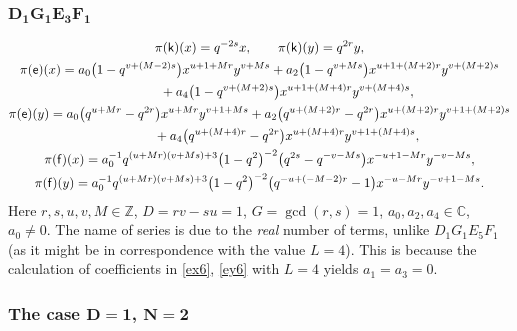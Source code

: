 \documentclass[10pt,a4paper]{amsart}
\numberwithin{equation}{section}
\begin{document}
\subsubsection*{$\boldsymbol{D_1G_1E_3F_1}$}
\begin{gather*}
\pi(\mathsf{k})(x)= q^{-2s}x ,\qquad\pi(\mathsf{k})(y)=q^{2r}y ,\\
 \pi(\mathsf{e})(x)= a_0\big(1-q^{v+(M-2)s}\big)x^{u+1+Mr}y^{v+Ms}+ a_2\big(1-q^{v+Ms}\big)x^{u+1+(M+2)r}y^{v+(M+2)s}\\
 \hphantom{\pi(\mathsf{e})(x)=}{}+ a_4\big(1-q^{v+(M+2)s}\big)x^{u+1+(M+4)r}y^{v+(M+4)s} ,\\
\pi(\mathsf{e})(y)= a_0\big(q^{u+Mr}-q^{2r}\big)x^{u+Mr}y^{v+1+Ms}+ a_2\big(q^{u+(M+2)r}-q^{2r}\big)x^{u+(M+2)r}y^{v+1+(M+2)s}\\
\hphantom{\pi(\mathsf{e})(y)=}{}+ a_4\big(q^{u+(M+4)r}-q^{2r}\big)x^{u+(M+4)r}y^{v+1+(M+4)s} ,\\
\pi(\mathsf{f})(x)= a_0^{-1}q^{(u+Mr)(v+Ms)+3}\big(1-q^2\big)^{-2}\big(q^{2s}-q^{-v-Ms}\big)x^{-u+1-Mr}y^{-v-Ms} ,\\
\pi(\mathsf{f})(y)= a_0^{-1}q^{(u+Mr)(v+Ms)+3}\big(1-q^2\big)^{-2}\big(q^{-u+(-M-2)r}-1\big)x^{-u-Mr}y^{-v+1-Ms} .
\end{gather*}
Here $r,s,u,v,M\in\mathbb{Z}$, $D=rv-su=1$, $G=\operatorname{gcd}(r,s)=1$, $a_0,a_2,a_4\in\mathbb{C}$, $a_0\ne 0$. The name of series is due to the {\it real} number of terms, unlike $D_1G_1E_5F_1$ (as it might be in correspondence with the value $L=4$). This is because the calculation of coefficients in \eqref{ex6}, \eqref{ey6} with $L=4$ yields $a_1=a_3=0$.

\subsubsection*{The case $\boldsymbol{D=1}$, $\boldsymbol{N=2}$}
\end{document}
